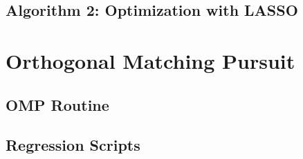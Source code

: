 \documentclass[11pt,a4paper]{report}
\begin{document}
\subsection{Algorithm 2: Optimization with LASSO}

\newpage

\section{Orthogonal Matching Pursuit}

\subsection{OMP Routine}


\newpage
\subsection{Regression Scripts}


\end{document}
